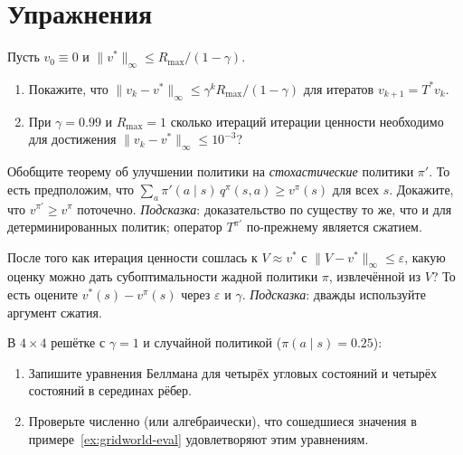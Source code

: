 \section*{Упражнения}

\begin{exercise}
\label{ex:dp-contraction-rate}
Пусть $v_0 \equiv 0$ и $\|v^*\|_\infty \le R_{\max}/(1-\gamma)$.
\begin{enumerate}[label=(\alph*)]
  \item Покажите, что $\|v_k - v^*\|_\infty \le \gamma^k R_{\max}/(1-\gamma)$ для итератов $v_{k+1} = T^* v_k$.
  \item При $\gamma = 0.99$ и $R_{\max} = 1$ сколько итераций итерации ценности необходимо для достижения $\|v_k - v^*\|_\infty \le 10^{-3}$?
\end{enumerate}
\end{exercise}

\begin{exercise}
\label{ex:dp-policy-improvement-stochastic}
Обобщите теорему об улучшении политики на \emph{стохастические} политики $\pi'$.  То есть предположим, что $\sum_a \pi'(a \mid s)\,q^\pi(s,a) \ge v^\pi(s)$ для всех $s$.  Докажите, что $v^{\pi'} \ge v^\pi$ поточечно.  \emph{Подсказка}: доказательство по существу то же, что и для детерминированных политик; оператор $T^{\pi'}$ по-прежнему является сжатием.
\end{exercise}

\begin{exercise}
\label{ex:dp-value-iter-policy}
После того как итерация ценности сошлась к $V \approx v^*$ с $\|V - v^*\|_\infty \le \varepsilon$, какую оценку можно дать субоптимальности жадной политики $\pi$, извлечённой из $V$?  То есть оцените $v^*(s) - v^\pi(s)$ через $\varepsilon$ и $\gamma$.  \emph{Подсказка}: дважды используйте аргумент сжатия.
\end{exercise}

\begin{exercise}
\label{ex:dp-gridworld-compute}
В $4\times4$ решётке с $\gamma=1$ и случайной политикой ($\pi(a \mid s) = 0.25$):
\begin{enumerate}[label=(\alph*)]
  \item Запишите уравнения Беллмана для четырёх угловых состояний и четырёх состояний в серединах рёбер.
  \item Проверьте численно (или алгебраически), что сошедшиеся значения в примере~\ref{ex:gridworld-eval} удовлетворяют этим уравнениям.
\end{enumerate}
\end{exercise}

